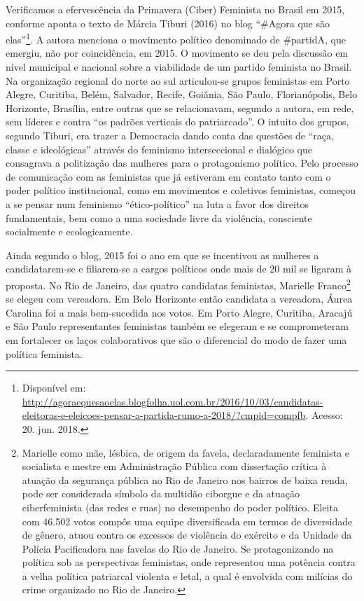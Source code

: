 Verificamos a efervescência da Primavera (Ciber) Feminista no Brasil em
2015, conforme aponta o texto de Márcia Tiburi (2016) no blog ``\#Agora
que são elas''\footnote{Disponível em:
  \url{http://agoraequesaoelas.blogfolha.uol.com.br/2016/10/03/candidatas-eleitoras-e-eleicoes-pensar-a-partida-rumo-a-2018/?cmpid=compfb}.
  Acesso: 20. jun. 2018.}. A autora menciona o movimento político
denominado de \#partidA, que emergiu, não por coincidência, em 2015. O
movimento se deu pela discussão em nível municipal e nacional sobre a
viabilidade de um partido feminista no Brasil. Na organização regional
do norte ao sul articulou-se grupos feministas em Porto Alegre,
Curitiba, Belém, Salvador, Recife, Goiânia, São Paulo, Florianópolis,
Belo Horizonte, Brasília, entre outras que se relacionavam, segundo a
autora, em rede, sem líderes e contra ``os padrões verticais do
patriarcado''. O intuito dos grupos, segundo Tiburi, era trazer a
Democracia dando conta das questões de ``raça, classe e ideológicas''
através do feminismo interseccional e dialógico que consagrava a
politização das mulheres para o protagonismo político. Pelo processo de
comunicação com as feministas que já estiveram em contato tanto com o
poder político institucional, como em movimentos e coletivos feministas,
começou a se pensar num feminismo ``ético-político'' na luta a favor dos
direitos fundamentais, bem como a uma sociedade livre da violência,
consciente socialmente e ecologicamente.

Ainda segundo o blog, 2015 foi o ano em que se incentivou as mulheres a
candidatarem-se e filiarem-se a cargos políticos onde mais de 20 mil se
ligaram à proposta. No Rio de Janeiro, das quatro candidatas feministas,
Marielle Franco\footnote{Marielle como mãe, lésbica, de origem da
  favela, declaradamente feminista e socialista e mestre em
  Administração Pública com dissertação crítica à atuação da segurança
  pública no Rio de Janeiro nos bairros de baixa renda, pode ser
  considerada símbolo da multidão ciborgue e da atuação ciberfeminista
  (das redes e ruas) no desempenho do poder político. Eleita com 46.502
  votos compôs uma equipe diversificada em termos de diversidade de
  gênero, atuou contra os excessos de violência do exército e da Unidade
  da Polícia Pacificadora nas favelas do Rio de Janeiro. Se
  protagonizando na política sob as perspectivas feministas, onde
  representou uma potência contra a velha política patriarcal violenta e
  letal, a qual é envolvida com milícias do crime organizado no Rio de
  Janeiro.} se elegeu com vereadora. Em Belo Horizonte então candidata a
vereadora, Áurea Carolina foi a mais bem-sucedida nos votos. Em Porto
Alegre, Curitiba, Aracajú e São Paulo representantes feministas também
se elegeram e se comprometeram em fortalecer os laços colaborativos que
são o diferencial do modo de fazer uma política feminista.

